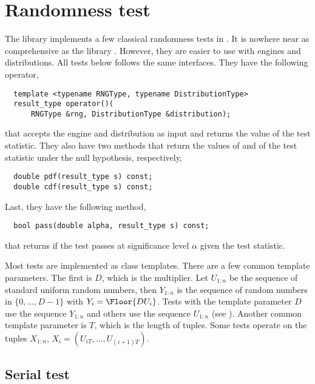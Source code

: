 \section{Randomness test}
\label{sec:Randomness tests}

The library implements a few classical randomness tests in \cite{Knuth:1997us}.
It is nowhere near as comprehensive as the \testu library
\cite{Lecuyer:2007hv}. However, they are easier to use with \cpp{} \rng engines
and distributions. All tests below follows the same interfaces. They have the
following operator,
\begin{Verbatim}
  template <typename RNGType, typename DistributionType>
  result_type operator()(
      RNGType &rng, DistributionType &distribution);
\end{Verbatim}
that accepts the \rng engine and distribution as input and returns the value of
the test statistic. They also have two methods that return the values of \pdf
and \cdf of the test statistic under the null hypothesis, respectively,
\begin{Verbatim}
  double pdf(result_type s) const;
  double cdf(result_type s) const;
\end{Verbatim}
Last, they have the following method,
\begin{Verbatim}
  bool pass(double alpha, result_type s) const;
\end{Verbatim}
that returns if the test passes at significance level $\alpha$ given the test
statistic.

Most tests are implemented as class templates. There are a few common template
parameters. The first is $D$, which is the multiplier. Let $U_{1:n}$ be the
sequence of standard uniform random numbers, then $Y_{1:n}$ is the sequence of
random numbers in $\{0,\dots,D - 1\}$ with $Y_i = \Floor{DU_i}$. Tests with the
template parameter $D$ use the sequence $Y_{1:n}$ and others use the sequence
$U_{1:n}$ (see \cite[pp.~61]{Knuth:1997us}). Another common template parameter
is $T$, which is the length of tuples. Some tests operate on the tuples
$X_{1:n}$, $X_i = (U_{iT},\dots,U_{(i+1)T})$.

\subsection{Serial test}
\label{sub:Serial test}

